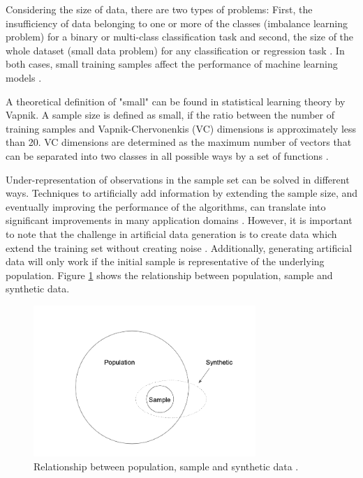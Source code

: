 Considering the size of data, there are two types of problems: First, the insufficiency of data belonging to one or more of the classes (imbalance learning problem) for a binary or multi-class classification task and second, the size of the whole dataset (small data problem) for any classification or regression task \cite{Sezer.2014}. In both cases, small training samples affect the performance of machine learning models \cite{Tsai.2008}. 

A theoretical definition of "small" can be found in statistical learning theory by Vapnik. A sample size is defined as small, if the ratio between the number of training samples and Vapnik-Chervonenkis (VC) dimensions is approximately less than 20. VC dimensions are determined as the maximum number of vectors that can be separated into two classes in all possible ways by a set of functions \cite{Vapnik.2008}.

Under-representation of observations in the sample set can be solved in different ways. Techniques to artificially add information by extending the sample size, and eventually improving the performance of the algorithms, can translate into significant improvements in many application domains \cite{Sezer.2014}. However, it is important to note that the challenge in artificial data generation is to create data which extend the training set without creating noise \cite{Li.2006}. Additionally, generating artificial data will only work if the initial sample is representative of the underlying population. Figure \ref{fig:relationship} shows the relationship between population, sample and synthetic data.

\begin{figure}
	\centering
	\includegraphics[width=0.75\textwidth]{../analysis/relationship.png}
	\caption{Relationship between population, sample and synthetic data \cite{Li.2006}.}
	\label{fig:relationship}
\end{figure}


